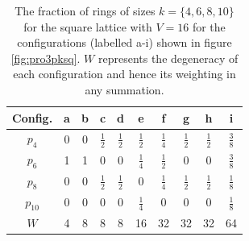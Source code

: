 \begin{table}[bt]
\centering
     \caption{The fraction of rings of sizes $k=\{4,6,8,10\}$ for the square lattice
with $V=16$ for the configurations (labelled a-i) shown in figure 
\ref{fig:pro3pksq}. $W$ represents the degeneracy of each configuration and hence its weighting in any
summation.}
\label{tab:sqV16}

     \begin{tabular}{cccccccccc}
     \toprule
      Config. & a & b & c & d & e & f & g & h & i\\
     \midrule
	$p_4$ & 0 & 0 & $\frac{1}{2}$ & $\frac{1}{2}$ & $\frac{1}{2}$ & $\frac{1}{4}$ & $\frac{1}{2}$ & $\frac{1}{2}$ & $\frac{3}{8}$ \\[0.5em]
		$p_6$ & 1 & 1 & 0 & 0 & $\frac{1}{4}$ & $\frac{1}{2}$ & 0 & 0 & $\frac{3}{8}$ \\[0.5em] 
		$p_8$ & 0 & 0 & $\frac{1}{2}$ & $\frac{1}{2}$ & 0 & $\frac{1}{4}$ & $\frac{1}{2}$ & $\frac{1}{2}$ & $\frac{1}{8}$ \\[0.5em]
		$p_{10}$ & 0 & 0 & 0 & 0 & $\frac{1}{4}$ & 0 & 0 & 0 & $\frac{1}{8}$ \\[0.5em]
		$W$ & 4 & 8 & 8 & 8 & 16 & 32 & 32 & 32 & 64 \\
     \bottomrule     
     
     \end{tabular}
\end{table}

